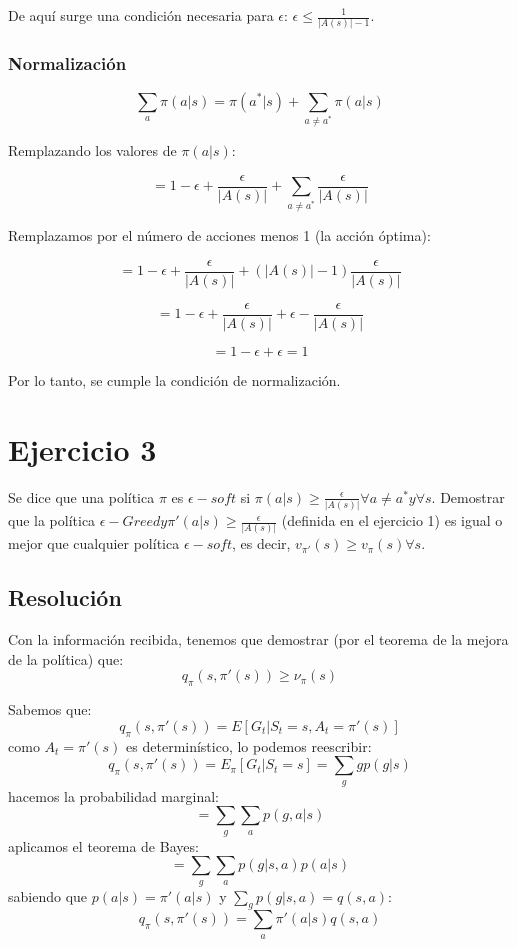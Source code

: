 \documentclass[12pt,a4paper]{article}
\begin{document}
De aquí surge una condición necesaria para $\epsilon$: $\epsilon \leq \frac{1}{|A(s)|-1}$.

\subsubsection{Normalización}

$$\sum_a \pi(a|s) = \pi(a^*|s) + \sum_{a\neq a^*} \pi(a|s)$$

Remplazando los valores de $\pi(a|s)$:

$$= 1 - \epsilon + \frac{\epsilon}{|A(s)|} + \sum_{a\neq a^*} \frac{\epsilon}{|A(s)|}$$

Remplazamos por el número de acciones menos 1 (la acción óptima):

$$= 1 - \epsilon + \frac{\epsilon}{|A(s)|} + (|A(s)|-1) \frac{\epsilon}{|A(s)|}$$

$$= 1 - \epsilon + \frac{\epsilon}{|A(s)|} + \epsilon - \frac{\epsilon}{|A(s)|}$$

$$= 1 - \epsilon + \epsilon = 1$$

Por lo tanto, se cumple la condición de normalización.

\section{Ejercicio 3}

Se dice que una política $\pi$ es $\epsilon-soft$ si 
$\pi(a|s) \geq \frac{\epsilon}{|A(s)|} \forall a \neq a^* y \forall s$.
Demostrar que la política $\epsilon-Greedy \pi'(a|s)\geq\frac{\epsilon}{|A(s)|}$
(definida en el ejercicio 1) es igual o mejor que cualquier política 
$\epsilon-soft$, es decir, $v_{\pi'}(s) \geq v_{\pi}(s) \forall s$.

\subsection{Resolución}

Con la información recibida, tenemos que demostrar (por el teorema de la 
mejora de la política) que:
$$q_\pi(s,\pi'(s)) \geq \nu_\pi(s)$$

Sabemos que:
$$q_{\pi}(s,\pi'(s)) = E[G_t|S_t=s,A_t=\pi'(s)]$$
como $A_t=\pi'(s)$ es determinístico, lo podemos reescribir:
$$ q_{\pi}(s,\pi'(s)) = E_\pi[G_t|S_t=s] = \sum_g gp(g|s)$$
hacemos la probabilidad marginal:
$$= \sum_g \sum_a p(g,a|s)$$
aplicamos el teorema de Bayes:
$$= \sum_g \sum_a p(g|s,a)p(a|s)$$
sabiendo que $p(a|s) = \pi'(a|s)$ y $\sum_g p(g|s,a) = q(s,a)$:
$$q_{\pi}(s,\pi'(s))= \sum_a \pi'(a|s)q(s,a)$$
\end{document}
